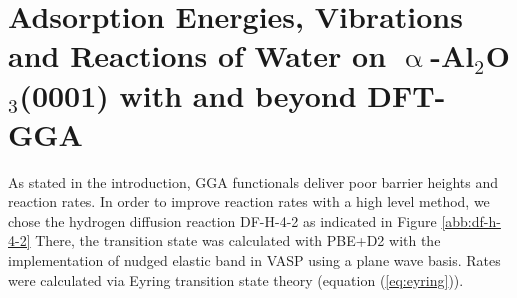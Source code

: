 \documentclass[11pt,DIV=13,BCOR=5mm,a4paper,headinclude]{scrbook}
\begin{document}
\section[Adsorption Energies, Vibrations and Reactions of Water on $\upalpha$-Al$_2$O$_3$(0001)]{Adsorption Energies, Vibrations and Reactions of Water on $\upalpha$-Al$_2$O$_3$(0001) with and beyond DFT-GGA}\label{crystal_calc}
As stated in the introduction, GGA functionals deliver poor barrier heights and reaction rates.
In order to improve reaction rates with a high level method, we chose the hydrogen diffusion reaction DF-H-4-2 as indicated in Figure \ref{abb:df-h-4-2}
There, the transition state was calculated with PBE+D2 with the implementation of nudged elastic band in VASP using a plane wave basis.
Rates were calculated via Eyring transition state theory (equation (\ref{eq:eyring})).

\end{document}
